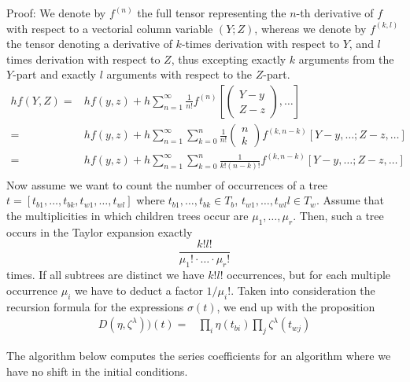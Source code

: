 \documentclass[english,unicode]{article}
\begin{document}
Proof:
We denote by $f^{(n)}$ the full tensor representing the $n$-th derivative of $f$ with respect to a vectorial column variable $(Y;Z)$, whereas we denote by $f^{(k,l)}$  the tensor 
denoting a derivative of $k$-times derivation with respect to $Y$, and $l$ times derivation with respect to $Z$, thus
excepting
exactly $k$ arguments from the $Y$-part and exactly $l$ arguments with respect to the $Z$-part.
\begin{align*}
hf(Y,Z)=&hf(y,z)+h\sum_{n=1}^{\infty} \frac{1}{n!} f^{(n)}\left[\begin{pmatrix} Y-y \\ Z-z \end{pmatrix},\dots \right]\\
=&hf(y,z)+h\sum_{n=1}^{\infty} \sum_{k=0}^n   \frac{1}{n!} \begin{pmatrix} n\\ k \end{pmatrix}   f^{(k,n-k)}\left[Y-y, \dots;  Z-z, \dots \right]\\
=&hf(y,z)+h\sum_{n=1}^{\infty} \sum_{k=0}^n   \frac{1}{k! (n-k)!}   f^{(k,n-k)}\left[Y-y, \dots;  Z-z, \dots \right]\\
\end{align*}
Now assume we want to count the number of occurrences of a tree $t=[t_{b1},\dots, t_{bk}, t_{w1},\dots, t_{wl}]$ where $t_{b1},\dots, t_{bk} \in T_b$, $t_{w1},\dots, t_{wl}l\in T_w$.
Assume that the multiplicities in which children trees occur  are $\mu_1,\dots, \mu_r$. Then, such a tree occurs in the Taylor expansion exactly
\[ \frac{k! l!}{\mu_1!\cdot \dots\cdot \mu_r!} \]
times. If all subtrees are distinct we have $k! l!$ occurrences, but for each multiple occurrence $\mu_i$ we have to deduct a factor $1/\mu_i!$.
Taken into consideration the recursion formula for the expressions $\sigma(t)$, we end up with the proposition
\begin{align}
D(\eta, \zeta^{\lambda}))(t)=&\prod_i \eta(t_{bi}) \prod_j \zeta^{\lambda}(t_{wj})
\end{align}





The algorithm below computes the series coefficients for an algorithm where we have no shift in the initial conditions.
\end{document}
